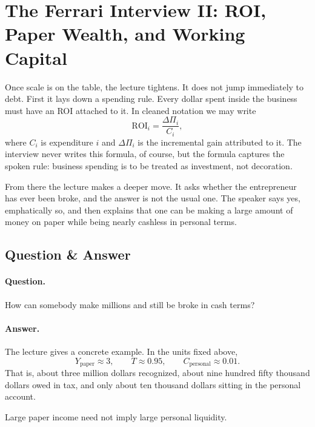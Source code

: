 \section{The Ferrari Interview II: ROI, Paper Wealth, and Working Capital}

Once scale is on the table, the lecture tightens. It does not jump immediately to debt. First it lays down a spending rule. Every dollar spent inside the business must have an ROI attached to it. In cleaned notation we may write
\begin{equation}
\mathrm{ROI}_i=\frac{\Delta \Pi_i}{C_i},
\end{equation}
where \(C_i\) is expenditure \(i\) and \(\Delta \Pi_i\) is the incremental gain attributed to it. The interview never writes this formula, of course, but the formula captures the spoken rule: business spending is to be treated as investment, not decoration.

From there the lecture makes a deeper move. It asks whether the entrepreneur has ever been broke, and the answer is not the usual one. The speaker says yes, emphatically so, and then explains that one can be making a large amount of money on paper while being nearly cashless in personal terms.

\subsection{Question \& Answer}

\paragraph{Question.} How can somebody make millions and still be broke in cash terms?

\paragraph{Answer.} The lecture gives a concrete example. In the units fixed above,
\begin{equation}
Y_{\text{paper}} \approx 3,\qquad T \approx 0.95,\qquad C_{\text{personal}} \approx 0.01.
\end{equation}
That is, about three million dollars recognized, about nine hundred fifty thousand dollars owed in tax, and only about ten thousand dollars sitting in the personal account.

\begin{proposition}
Large paper income need not imply large personal liquidity.
\end{proposition}

